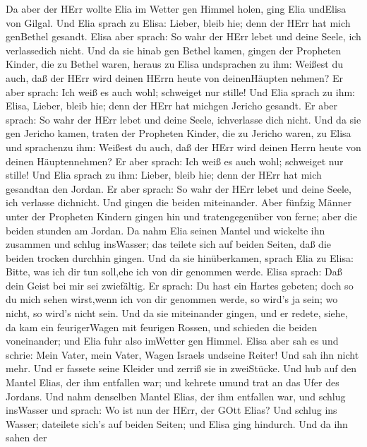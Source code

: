  Da aber der HErr wollte Elia im Wetter gen Himmel holen,
ging Elia undElisa von Gilgal.  Und Elia sprach zu Elisa:
Lieber, bleib hie; denn der HErr hat mich genBethel gesandt. Elisa aber
sprach: So wahr der HErr lebet und deine Seele, ich verlassedich nicht.
Und da sie hinab gen Bethel kamen,  gingen der Propheten
Kinder, die zu Bethel waren, heraus zu Elisa undsprachen zu ihm: Weißest
du auch, daß der HErr wird deinen HErrn heute von deinenHäupten nehmen?
Er aber sprach: Ich weiß es auch wohl; schweiget nur stille!
 Und Elia sprach zu ihm: Elisa, Lieber, bleib hie; denn der
HErr hat michgen Jericho gesandt. Er aber sprach: So wahr der HErr lebet
und deine Seele, ichverlasse dich nicht. Und da sie gen Jericho kamen,
 traten der Propheten Kinder, die zu Jericho waren, zu Elisa
und sprachenzu ihm: Weißest du auch, daß der HErr wird deinen Herrn
heute von deinen Häuptennehmen? Er aber sprach: Ich weiß es auch wohl;
schweiget nur stille!  Und Elia sprach zu ihm: Lieber, bleib
hie; denn der HErr hat mich gesandtan den Jordan. Er aber sprach: So
wahr der HErr lebet und deine Seele, ich verlasse dichnicht. Und gingen
die beiden miteinander.  Aber fünfzig Männer unter der
Propheten Kindern gingen hin und tratengegenüber von ferne; aber die
beiden stunden am Jordan.  Da nahm Elia seinen Mantel und
wickelte ihn zusammen und schlug insWasser; das teilete sich auf beiden
Seiten, daß die beiden trocken durchhin gingen.  Und da sie
hinüberkamen, sprach Elia zu Elisa: Bitte, was ich dir tun soll,ehe ich
von dir genommen werde. Elisa sprach: Daß dein Geist bei mir sei
zwiefältig.  Er sprach: Du hast ein Hartes gebeten; doch so
du mich sehen wirst,wenn ich von dir genommen werde, so wird's ja sein;
wo nicht, so wird's nicht sein.  Und da sie miteinander
gingen, und er redete, siehe, da kam ein feurigerWagen mit feurigen
Rossen, und schieden die beiden voneinander; und Elia fuhr also imWetter
gen Himmel.  Elisa aber sah es und schrie: Mein Vater, mein
Vater, Wagen Israels undseine Reiter! Und sah ihn nicht mehr. Und er
fassete seine Kleider und zerriß sie in zweiStücke.  Und
hub auf den Mantel Elias, der ihm entfallen war; und kehrete umund trat
an das Ufer des Jordans.  Und nahm denselben Mantel Elias,
der ihm entfallen war, und schlug insWasser und sprach: Wo ist nun der
HErr, der GOtt Elias? Und schlug ins Wasser; dateilete sich's auf beiden
Seiten; und Elisa ging hindurch.  Und da ihn sahen der
